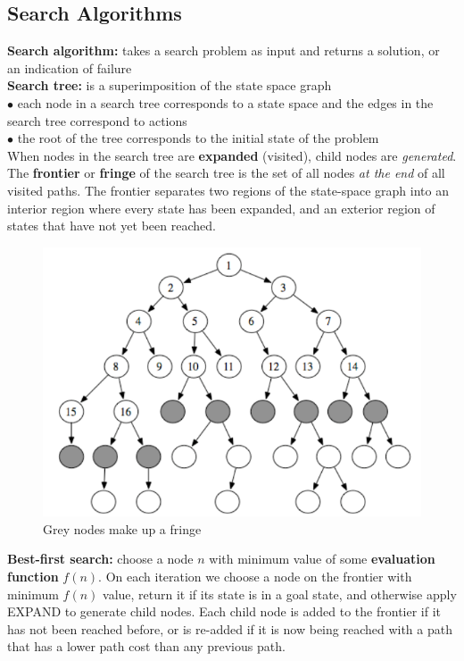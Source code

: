     \subsection{Search Algorithms}                          %

        \textbf{Search algorithm:} takes a search problem as input and returns a solution, or an indication of failure \\
        \textbf{Search tree:} is a superimposition of the state space graph \\
        $\bullet$ each node in a search tree corresponds to a state space and the edges in the search tree correspond to actions \\
        $\bullet$ the root of the tree corresponds to the initial state of the problem \\

        When nodes in the search tree are \textbf{expanded} (visited), child nodes are \textit{generated}. The \textbf{frontier} or \textbf{fringe} of the search tree is the set of all nodes \textit{at the end} of all
        visited paths. The frontier separates two regions of the state-space graph into an interior region where every state has been expanded, and an exterior region of states that have not yet been reached.

        \begin{figure}[hbt!]
            \centering
            \caption*{Grey nodes make up a fringe}
            \includegraphics[scale = 0.4]{Assets/Fringe}
        \end{figure}

        \pagebreak
        \textbf{Best-first search:} choose a node $n$ with minimum value of some \textbf{evaluation function} $f(n)$. On each iteration we choose a node on the frontier with minimum $f(n)$ value, return it if its state
        is in a goal state, and otherwise apply EXPAND to generate child nodes. Each child node is added to the frontier if it has not been reached before, or is re-added if it is now being reached with a path that
        has a lower path cost than any previous path. \\

